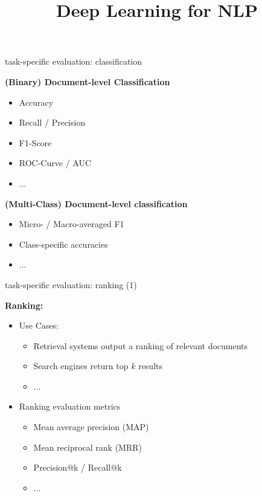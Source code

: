\documentclass[11pt,compress,t,notes=noshow, xcolor=table]{beamer}
\title{Deep Learning for NLP}
\begin{document}


\begin{frame}{task-specific evaluation: classification}

\vfill

\textbf{(Binary) Document-level Classification}

\begin{itemize}
	\item Accuracy
	\item Recall / Precision
	\item F1-Score
	\item ROC-Curve / AUC
	\item ...
\end{itemize}

\textbf{(Multi-Class) Document-level classification}

\begin{itemize}
	\item Micro- / Macro-averaged F1
	\item Class-specific accuracies
	\item ...
\end{itemize}
\vfill

\end{frame}


\begin{frame}{task-specific evaluation: ranking (1)}

\vfill

\textbf{Ranking:}

\begin{itemize}
		\item Use Cases:
				\begin{itemize}
					\item Retrieval systems output a ranking of relevant documents
					\item Search engines return top $k$ results
					\item ...
				\end{itemize}
		\item Ranking evaluation metrics
				\begin{itemize}
					\item Mean average precision (MAP)
					\item Mean reciprocal rank (MRR)
					\item Precision@k / Recall@k
					\item ...
				\end{itemize}
\end{itemize}
\vfill

\end{frame}
\end{document}
